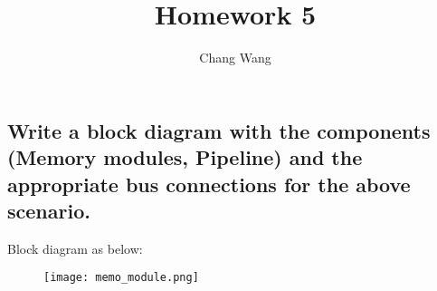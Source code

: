 \documentclass[12pt]{report}
\title{Homework 5}
\author{Chang Wang}
\begin{document}
\maketitle

\subsection{Write a block diagram with the components (Memory modules, Pipeline) and the appropriate bus connections for the above scenario.}

Block diagram as below:

\begin{figure}[hb]
\begin{center}
\texttt{[image: memo\_module.png]}
\end{center}
\end{figure}
\end{document}
